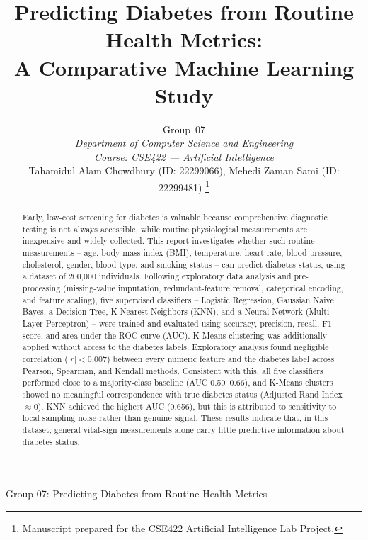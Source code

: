 \documentclass[journal]{IEEEtran}
\begin{document}
\title{Predicting Diabetes from Routine Health Metrics: \\ A Comparative Machine Learning Study}

\author{Group~07 \\
\textit{Department of Computer Science and Engineering} \\
\textit{Course: CSE422 --- Artificial Intelligence} \\
Tahamidul Alam Chowdhury (ID: 22299066), Mehedi Zaman Sami (ID: 22299481)
\thanks{Manuscript prepared for the CSE422 Artificial Intelligence Lab Project.}}

%
{Group 07: Predicting Diabetes from Routine Health Metrics}

\maketitle

\begin{abstract}
Early, low-cost screening for diabetes is valuable because comprehensive diagnostic testing is not always accessible, while routine physiological measurements are inexpensive and widely collected. This report investigates whether such routine measurements -- age, body mass index (BMI), temperature, heart rate, blood pressure, cholesterol, gender, blood type, and smoking status -- can predict diabetes status, using a dataset of 200{,}000 individuals. Following exploratory data analysis and pre-processing (missing-value imputation, redundant-feature removal, categorical encoding, and feature scaling), five supervised classifiers -- Logistic Regression, Gaussian Naive Bayes, a Decision Tree, K-Nearest Neighbors (KNN), and a Neural Network (Multi-Layer Perceptron) -- were trained and evaluated using accuracy, precision, recall, F1-score, and area under the ROC curve (AUC). K-Means clustering was additionally applied without access to the diabetes labels. Exploratory analysis found negligible correlation ($|r| < 0.007$) between every numeric feature and the diabetes label across Pearson, Spearman, and Kendall methods. Consistent with this, all five classifiers performed close to a majority-class baseline (AUC 0.50--0.66), and K-Means clusters showed no meaningful correspondence with true diabetes status (Adjusted Rand Index $\approx 0$). KNN achieved the highest AUC (0.656), but this is attributed to sensitivity to local sampling noise rather than genuine signal. These results indicate that, in this dataset, general vital-sign measurements alone carry little predictive information about diabetes status.
\end{abstract}
\end{document}
